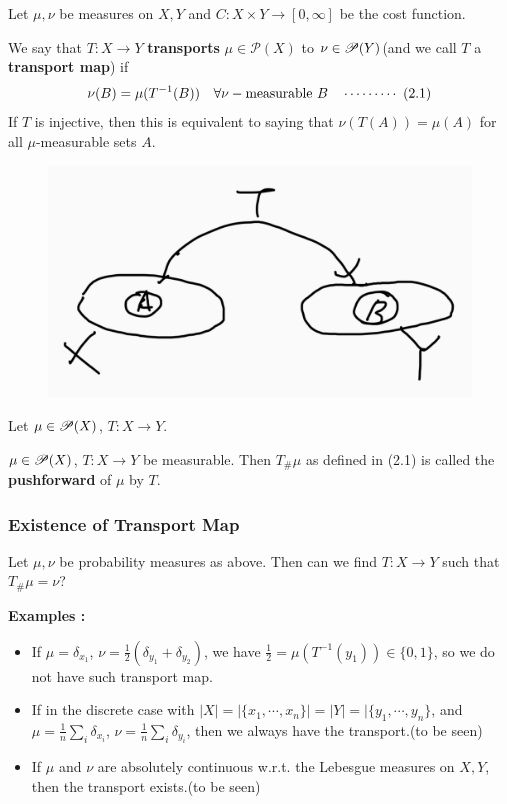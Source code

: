\documentclass[12pt,a4paper]{article}
\renewenvironment{i}
{\begin{itemize} 
	}%
	{\end{itemize}
}
\begin{document}
Let $\mu, \nu$ be measures on $X, Y$ and $C : X\times Y \rightarrow [0, \infty]$ be the cost function.
\s

 We say that $T: X\rightarrow Y$ \textbf{transports} $\mu \in \mathscr{P}(X)$ to $\nu \in \mathscr{P}(Y)$(and we call $T$ a \textbf{transport map}) if
\begin{align*}
\nu(B) = \mu(T^{-1}(B)) \quad \forall \nu-\text{measurable } B \quad \cdots\cdots\cdots\,\,(2.1)
\end{align*}
If $T$ is injective, then this is equivalent to saying that $\nu(T(A)) = \mu(A)$ for all $\mu$-measurable sets $A$.
\s

\begin{figure}[h]
\begin{center}
    \includegraphics[scale=0.15]{2}
\end{center}
\end{figure}

Let $\mu \in \mathscr{P}(X)$, $T:X\rightarrow Y$.
\s

 $\mu \in \mathscr{P}(X)$, $T: X\rightarrow Y$ be measurable. Then $T_{\#} \mu$ as defined in (2.1) is called the \textbf{pushforward} of $\mu$ by $T$.
\s

\subsubsection*{Existence of Transport Map}
Let $\mu, \nu$ be probability measures as above. Then can we find $T : X\rightarrow Y$ such that $T_{\#} \mu =\nu$?
\s

\textbf{Examples :}
\begin{i}
\item If $\mu = \delta_{x_1}$, $\nu = \frac{1}{2}(\delta_{y_1} + \delta_{y_2})$, we have $\frac{1}{2} = \mu(T^{-1}(y_1)) \in \{0,1\}$, so we do not have such transport map.
\item If in the discrete case with $|X|= |\{x_1, \cdots, x_n\}| = |Y| = |\{y_1, \cdots, y_n\}$, and $\mu = \frac{1}{n}\sum_{i} \delta_{x_i}$, $\nu = \frac{1}{n}\sum_i \delta_{y_i}$, then we always have the transport.(to be seen)
\item If $\mu$ and $\nu$ are absolutely continuous w.r.t. the Lebesgue measures on $X, Y$, then the transport exists.(to be seen)
\end{i} 
\end{document}
